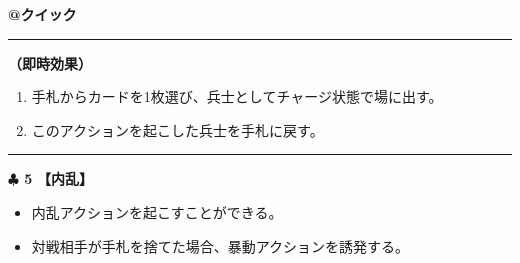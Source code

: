 \documentclass[twocolumn,a5paper,papersize,10pt]{jarticle}
\begin{document}
\begin{tcolorbox}[title={\small\bf【Action】スイッチ}{\scriptsize （兵士起因）}]

{\scriptsize\bf @クイック }

\vspace{1mm} %
\hrule height 0.1mm depth 0mm width 62mm %
\vspace{1mm} %

{\bf（即時効果）}


\vspace{-1zh}%
\begin{enumerate}
\setlength{\leftskip}{-0.3cm}
\setlength{\parskip}{0pt} %

\item 手札からカードを1枚選び、兵士としてチャージ状態で場に出す。

\item このアクションを起こした兵士を手札に戻す。
\vspace{-1zh}%
\end{enumerate}

\vspace{1mm} %
\end{tcolorbox}

\vspace{-1zh}

 
 
 
 
 

\vspace{3mm} %
\hrule height 0.5mm depth 0mm width 66.5mm %
\vspace{1mm} %
{\Large\bf $\clubsuit$ 5} {\normalsize\bf【内乱】} %
\vspace{1mm} %


\vspace{-1zh}%
\begin{itemize}
\setlength{\leftskip}{-0.3cm}
\setlength{\parskip}{0pt} %

\item 内乱アクションを起こすことができる。

\item 対戦相手が手札を捨てた場合、暴動アクションを誘発する。
\vspace{-1zh}%
\end{itemize}
\end{document}
